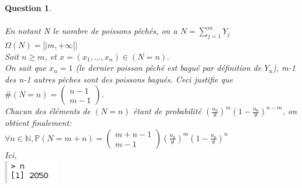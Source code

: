 \documentclass[a4paper,11pt]{article}
\newtheorem{exo2}{Question}
\begin{document}
\begin{exo2} \ \\ \\
En notant N le nombre de poissons pêchés, on a $N = \sum\limits_{j=1}^{m} Y_j$\ \\
$\Omega(N) = [| m, +\infty [|$ \ \\
Soit $n \geqslant m$, et $x = (x_1, ..., x_n) \in (N = n).$ \ \\
On sait que $x_n = 1$ (le dernier poisson pêché est bagué par définition de $Y_n$), m-1 des n-1 autres pêches sont des poissons bagués. Ceci justifie que $\#(N=n) = \begin{pmatrix} n-1 \\ m-1\end{pmatrix}$. \ \\
Chacun des éléments de $(N=n)$ étant de probabilité $(\frac{n_0}{\theta})^m (1 - \frac{n_0}{\theta})^{n-m}$, on obtient finalement: \
$\forall n \in \mathbb{N}, \mathbb{P}(N = m+n) = \begin{pmatrix} m + n-1 \\ m-1\end{pmatrix}(\frac{n_0}{\theta})^m (1 - \frac{n_0}{\theta})^{n}$ \ \\
Ici,\ \\
\includegraphics[scale=0.5]{images/Q2_2.png} \ \\
\end{exo2}
\end{document}
